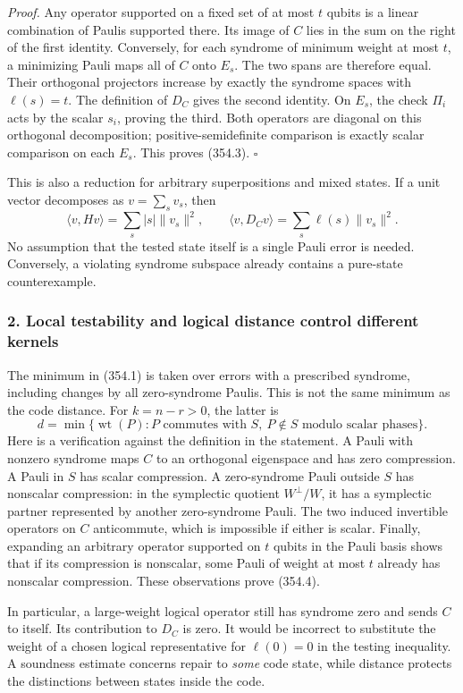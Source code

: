 \documentclass[11pt]{article}
\begin{document}
\emph{Proof.} Any operator supported on a fixed set of at most $t$ qubits is a linear combination of Paulis supported there. Its image of $C$ lies in the sum on the right of the first identity. Conversely, for each syndrome of minimum weight at most $t$, a minimizing Pauli maps all of $C$ onto $E_s$. The two spans are therefore equal. Their orthogonal projectors increase by exactly the syndrome spaces with $\ell(s)=t$. The definition of $D_C$ gives the second identity. On $E_s$, the check $\Pi_i$ acts by the scalar $s_i$, proving the third. Both operators are diagonal on this orthogonal decomposition; positive-semidefinite comparison is exactly scalar comparison on each $E_s$. This proves (354.3). $\square$

This is also a reduction for arbitrary superpositions and mixed states. If a unit vector decomposes as $v=\sum_sv_s$, then
\[
 \langle v,Hv\rangle=\sum_s|s|\|v_s\|^2,
 \qquad
 \langle v,D_Cv\rangle=\sum_s\ell(s)\|v_s\|^2.
\]
No assumption that the tested state itself is a single Pauli error is needed. Conversely, a violating syndrome subspace already contains a pure-state counterexample.

\subsubsection{2. Local testability and logical distance control different kernels}
The minimum in (354.1) is taken over errors with a prescribed syndrome, including changes by all zero-syndrome Paulis. This is not the same minimum as the code distance. For $k=n-r>0$, the latter is
\[
 d=\min\{\operatorname{wt}(P):P\text{ commutes with }S,
                       \ P\notin S\text{ modulo scalar phases}\}.
 \tag{354.4}
\]
Here is a verification against the definition in the statement. A Pauli with nonzero syndrome maps $C$ to an orthogonal eigenspace and has zero compression. A Pauli in $S$ has scalar compression. A zero-syndrome Pauli outside $S$ has nonscalar compression: in the symplectic quotient $W^\perp/W$, it has a symplectic partner represented by another zero-syndrome Pauli. The two induced invertible operators on $C$ anticommute, which is impossible if either is scalar. Finally, expanding an arbitrary operator supported on $t$ qubits in the Pauli basis shows that if its compression is nonscalar, some Pauli of weight at most $t$ already has nonscalar compression. These observations prove (354.4).

In particular, a large-weight logical operator still has syndrome zero and sends $C$ to itself. Its contribution to $D_C$ is zero. It would be incorrect to substitute the weight of a chosen logical representative for $\ell(0)=0$ in the testing inequality. A soundness estimate concerns repair to \emph{some} code state, while distance protects the distinctions between states inside the code.
\end{document}
